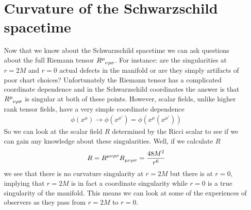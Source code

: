 \documentclass[11pt,table]{article}
\begin{document}
        \section{Curvature of the Schwarzschild spacetime}
            Now that we know about the Schwarzschild spacetime we can ask questions about the full Riemann tensor $\tensor{R}{^\mu_\nu_\rho_\sigma}$.  For instance: are the singularities at $r=2M$ and $r=0$ actual defects in the manifold or are they simply artifacts of poor chart choices? Unfortunately the Riemann tensor has a complicated coordinate dependence and in the Schwarzschild coordinates the answer is that $\tensor{R}{^\mu_\nu_\rho_\sigma}$ is singular at both of these points. However, scalar fields, unlike higher rank tensor fields, have a very simple coordinate dependence
            \begin{align*}
                \phi(x^{\mu})\rightarrow\phi(x^{\mu'})=\phi(x^{\mu}(x^{\mu'}))
            \end{align*}
            So we can look at the scalar field $R$ determined by the Ricci scalar to see if we can gain any knowledge about these singularities.  Well, if we calculate $R$
            \begin{align}
                R=\tensor{R}{^\mu^\nu^\rho^\sigma}\tensor{R}{_\mu_\nu_\rho_\sigma}=\frac{48M^2}{r^6}
            \end{align}
            we see that there is no curvature singularity at $r=2M$ but there is at $r=0$, implying that $r=2M$ is in fact a coordinate singularity while $r=0$ is a true singularity of the manifold. This means we can look at some of the experiences of observers as they pass from $r=2M$ to $r=0$.
\end{document}
